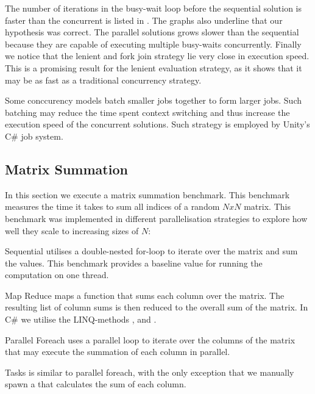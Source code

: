 
The number of iterations in the busy-wait loop before the sequential solution is faster than the concurrent is listed in . The graphs also underline that our hypothesis was correct. The parallel solutions grows slower than the sequential because they are capable of executing multiple busy-waits concurrently. Finally we notice that the lenient and fork join strategy lie very close in execution speed. This is a promising result for the lenient evaluation strategy, as it shows that it may be as fast as a traditional concurrency strategy.

Some conccurency models batch smaller jobs together to form larger jobs\needcite. Such batching may reduce the time spent context switching and thus increase the execution speed of the concurrent solutions. Such strategy is employed by Unity's C\# job system\cite{unity:csharp:job:system}.

\subsection{Matrix Summation}
In this section we execute a matrix summation benchmark. This benchmark measures the time it takes to sum all indices of a random $N x N$ matrix. This benchmark was implemented in different parallelisation strategies to explore how well they scale to increasing sizes of $N$:

\begin{labeling}{\quad\quad}
    \item[Sequential] utilises a double-nested for-loop to iterate over the matrix and sum the values. This benchmark provides a baseline value for running the computation on one thread.
    \item[Map Reduce] maps a function that sums each column over the matrix. The resulting list of column sums is then reduced to the overall sum of the matrix. In C\# we utilise the \gls{LINQ}-methods ,  and .
    \item[Parallel Foreach] uses a parallel loop to iterate over the columns of the matrix that may execute the summation of each column in parallel.
    \item[Tasks] is similar to parallel foreach, with the only exception that we manually spawn a  that calculates the sum of each column.
\end{labeling}

